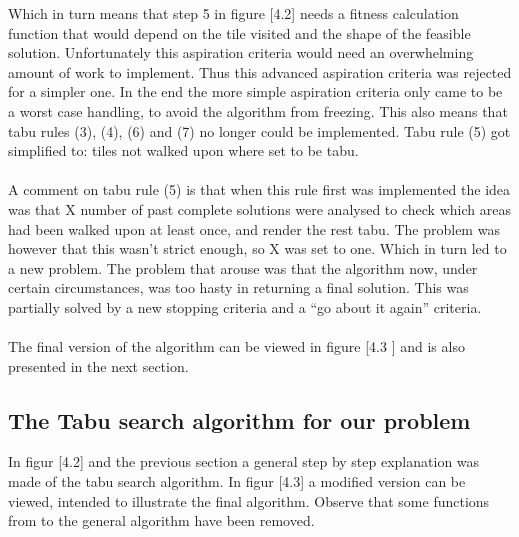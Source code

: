 Which in turn means that step 5 in figure [4.2] needs a fitness calculation function that would depend on the tile visited and the shape of the feasible solution. Unfortunately this aspiration criteria would need an overwhelming amount of work to implement. Thus this advanced aspiration criteria was rejected for a simpler one. In the end the more simple aspiration criteria only came to be a worst case handling, to avoid the algorithm from freezing. This also means that tabu rules (3), (4), (6) and (7) no longer could be implemented. Tabu rule (5) got simplified to: tiles not walked upon where set to be tabu.\\
\\A comment on tabu rule (5) is that when this rule first was implemented the idea was that X number of past complete solutions were analysed to check which areas had been walked upon at least once, and render the rest tabu. The problem was however that this wasn't strict enough, so X was set to one. Which in turn led to a new problem. The problem that arouse was that the algorithm now, under certain circumstances, was too hasty in returning a final solution. This was partially solved by a new stopping criteria and a ``go about it again'' criteria.\\
\\The final version of the algorithm can be viewed in figure [4.3 ] and is also presented in the next section.
\subsection{The Tabu search algorithm for our problem}
In figur [4.2] and the previous section a general step by step explanation was made of the tabu search algorithm. In figur [4.3] a modified version can be viewed, intended to illustrate the final algorithm. Observe that some functions from to the general algorithm have been removed.\\


